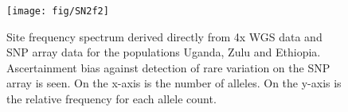 \begin{figure}
\centering
\texttt{[image: fig/SN2f2]}
\caption[xxx]{Site frequency spectrum derived directly from 4x \gls{WGS} data and SNP array data for the populations Uganda, Zulu and Ethiopia. Ascertainment bias against detection of rare variation on the SNP array is seen. On the x-axis is the number of alleles. On the y-axis is the relative frequency for each allele count.}
\label{fig:SN2f2}
\end{figure}
